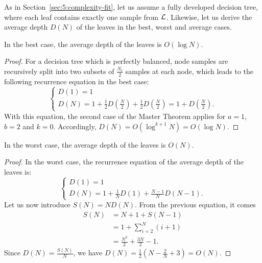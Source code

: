 As in Section~\ref{sec:5:complexity-fit}, let us assume a fully developed
decision tree, where each leaf contains exactly one sample from ${\cal L}$.
Likewise, let us derive the average depth $D(N)$ of the leaves in the best,
worst and average cases.

\begin{theorem}\label{thm:6:best:depth}
In the best case, the average depth of the leaves is $O(\log N)$.
\end{theorem}

\begin{proof}
For a decision tree which is perfectly balanced, node samples are recursively split
into two subsets of $\tfrac{N_t}{2}$ samples at each node, which leads to the following
recurrence equation in the best case:
\begin{equation}
\begin{cases}
D(1) = 1 \\
D(N) = 1 + \frac{1}{2} D(\frac{N}{2}) + \frac{1}{2} D(\frac{N}{2}) = 1+D(\frac{N}{2}).
\end{cases}
\end{equation}
With this equation, the second case of the Master Theorem applies for $a=1$, $b=2$ and $k=0$.
Accordingly, $D(N)=O(\log^{k+1} N) = O(\log N)$.
\end{proof}

\begin{theorem}\label{thm:6:worst:depth}
In the worst case, the average depth of the leaves is $O(N)$.
\end{theorem}

\begin{proof}
In the worst case, the recurrence equation of the average depth of the leaves is:
\begin{equation}
\begin{cases}
D(1) = 1 \\
D(N) = 1 + \frac{1}{N} D(1) + \frac{N-1}{N} D(N-1).
\end{cases}
\end{equation}
Let us now introduce $S(N)=N D(N)$. From the previous equation, it comes
\begin{align}
S(N) &= N+1 + S(N-1) \nonumber \\
     &= 1+ \sum_{i=2}^N (i + 1) \nonumber \\
     &= \frac{N^2}{2} + \frac{3N}{2} - 1.
\end{align}
Since $D(N) = \tfrac{S(N)}{N}$, we have $D(N) = \frac{1}{2} (N - \frac{2}{N} + 3) = O(N)$.
\end{proof}

